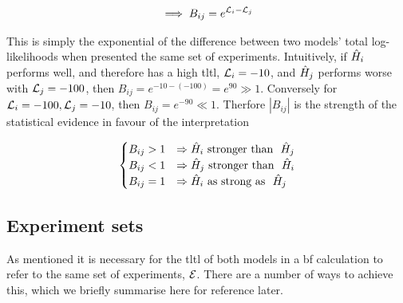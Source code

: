 \begin{equation}
    \label{eqn:bf_succinct}
    \implies B_{ij} = e^{{\mathcal{L}}_{i} - {\mathcal{L}}_{j}}    
\end{equation}


This is simply the exponential of the difference between two models' total log-likelihoods when presented the same set of experiments. 
Intuitively, if $\hat{H}_i$ performs well, and therefore has a high \gls{tltl}, ${\mathcal{L}}_{i}=-10$, 
    and $\hat{H}_j$ performs worse with ${\mathcal{L}}_{j}=-100$, then $B_{ij} = e^{-10-(-100)} = e^{90} \gg 1$.
Conversely for ${\mathcal{L}}_{i}=-100, {\mathcal{L}}_{j}=-10$, then $B_{ij} = e^{-90} \ll 1$. 
Therfore $\left| B_{ij} \right|$ is the strength of the statistical evidence
    in favour of the interpretation 

\begin{equation}
    \label{eqn:bf_cases}
    \begin{cases}
        B_{ij} > 1 & \Rightarrow \hat{H}_i \text{\ stronger than \ } \hat{H}_j \\
        B_{ij} < 1 & \Rightarrow \hat{H}_j \text{\ stronger than \ } \hat{H}_i \\
        B_{ij} = 1 & \Rightarrow \hat{H}_i \text{\ as strong as \ } \hat{H}_j \\
    \end{cases}
\end{equation} 

\subsection{Experiment sets}
As mentioned it is necessary for the \gls{tltl} of both models in a \gls{bf} calculation to
    refer to the same set of experiments, ${ \mathcal{E} }$. 
There are a number of ways to achieve this, 
    which we briefly summarise here for reference later. 
\par 

